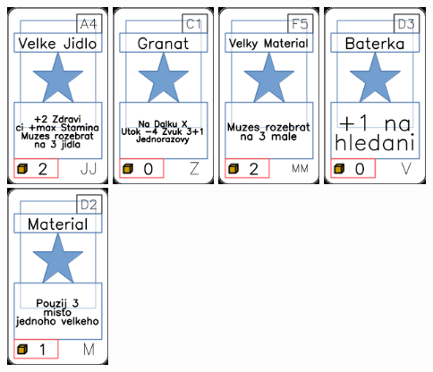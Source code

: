 \documentclass[a4paper]{article}
\begin{document}
	\includegraphics[width=3.0cm]{img-1_33}
	\includegraphics[width=3.0cm]{img-1_100}
	\includegraphics[width=3.0cm]{img-1_59}
	\includegraphics[width=3.0cm]{img-1_77}
	\includegraphics[width=3.0cm]{img-1_46}
\end{document}
